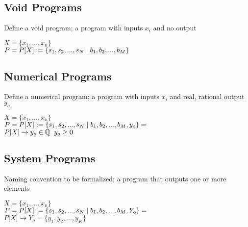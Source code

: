 \documentclass[11pt]{article}
\begin{document}
\subsection{Void Programs}
Define a void program; a program with inputs $x_i$ and no output
\begin{center}
$
X = \{x_1,...,x_n\}
$
\\ \vspace{2mm}
$P = P\lbrack X \rbrack := \{ s_1,s_2,...,s_{N}\hspace{1mm}|\hspace{1mm} b_1, b_2,...,b_M\}$
\end{center}





\subsection{Numerical Programs}
Define a numerical program; a program with inputs $x_i$ and real, rational output $y_o$
\begin{center}
$
X = \{x_1,...,x_n\}
$
\\ \vspace{2mm}
$P = P\lbrack X \rbrack := \{ s_1,s_2,...,s_{N}\hspace{1mm}|\hspace{1mm} b_1, b_2,...,b_M,y_o\}=$
\\ \vspace{2mm}
$
P\lbrack X \rbrack \rightarrow y_o \in \mathbb{Q} \hspace{2mm} y_o \geq 0
$
\end{center}





\subsection{System Programs}
Naming convention to be formalized; a program that outputs one or more elements
\begin{center}
$
X = \{x_1,...,x_n\}
$
\\ \vspace{2mm}
$P = P\lbrack X \rbrack := \{ s_1,s_2,...,s_{N}\hspace{1mm}|\hspace{1mm} b_1, b_2,...,b_M,Y_o\}=$
\\ \vspace{2mm}
$
P\lbrack X \rbrack \rightarrow Y_o = \{y_1,y_2,...,y_K\}
$
\end{center}
\end{document}
